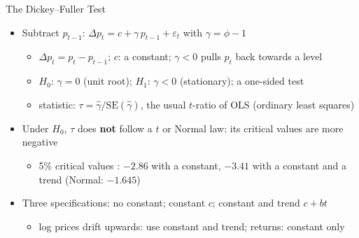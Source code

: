 \begin{frame}{The Dickey--Fuller Test}
\itemsize{\small}
\begin{itemize}
    \item Subtract $p_{t-1}$: $\Delta p_t = c + \gamma\, p_{t-1} + \varepsilon_t$ with $\gamma = \phi - 1$ 
    \begin{itemize}
        \item $\Delta p_t = p_t - p_{t-1}$; $c$: a constant; $\gamma < 0$ pulls $p_t$ back towards a level
        \item $H_0$: $\gamma = 0$ (unit root); $H_1$: $\gamma < 0$ (stationary); a one-sided test
        \item statistic: $\tau = \hat\gamma/\mathrm{SE}(\hat\gamma)$, the usual $t$-ratio of OLS (ordinary least squares)
    \end{itemize}
    \item Under $H_0$, $\tau$ does \textbf{not} follow a $t$ or Normal law: its critical values are more negative
    \begin{itemize}
        \item 5\% critical values : $-2.86$ with a constant, $-3.41$ with a constant and a trend (Normal: $-1.645$)
    \end{itemize}
    \item Three specifications: no constant; constant $c$; constant and trend $c + bt$
    \begin{itemize}
        \item log prices drift upwards: use constant and trend; returns: constant only
    \end{itemize}
\end{itemize}
\end{frame}

